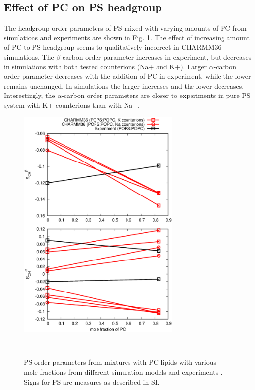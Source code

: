 \documentclass[aps,prl,superscriptaddress,twocolumn]{revtex4}
\begin{document}

\subsection{Effect of PC on PS headgroup}
The headgroup order parameters of PS mixed with varying amounts of PC
from simulations and experiments \cite{borle85,roux90}
are shown in Fig. \ref{HGorderparametersPSPGvsPC}. The effect of increasing
amount of PC to PS headgroup seems to qualitatively incorrect in CHARMM36 simulations.
The $\beta$-carbon order parameter increases in experiment, but decreases
in simulations with both tested counterions (Na+ and K+). Larger
$\alpha$-carbon order parameter decreases with the addition of PC
in experiment, while the lower remains unchanged. In simulations the
larger increases and the lower decreases.
Interestingly, the $\alpha$-carbon order parameters are closer to experiments
in pure PS system with K+ counterions than with Na+. 
\begin{figure}[]
  \centering
  \includegraphics[width=8.0cm]{../Figs/HGorderparametersPSvsPC.eps}
  \caption{\label{HGorderparametersPSPGvsPC}
    PS order parameters from mixtures with PC
    lipids with various mole fractions from different simulation models and experiments \cite{borle85,roux90}.
    Signs for PS are measures as described in SI.
  }
   \\
\end{figure}
\end{document}
